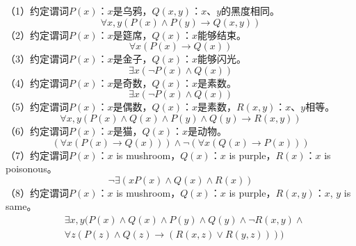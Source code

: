 \begin{solution}
    （1）约定谓词$P(x)$：$x$是乌鸦，$Q(x,y)$：$x$、$y$的黑度相同。
    $$\forall x,y (P(x)\wedge P(y)\rightarrow Q(x,y))$$
    （2）约定谓词$P(x)$：$x$是筵席，$Q(x)$：$x$能够结束。
    $$\forall x (P(x)\rightarrow Q(x))$$
    （3）约定谓词$P(x)$：$x$是金子，$Q(x)$：$x$能够闪光。
    $$\exists x (\neg P(x) \wedge Q(x))$$
    （4）约定谓词$P(x)$：$x$是奇数，$Q(x)$：$x$是素数。
    $$\exists x (\neg P(x) \wedge Q(x))$$
    （5）约定谓词$P(x)$：$x$是偶数，$Q(x)$：$x$是素数，$R(x,y)$：$x$、$y$相等。
    $$\forall x,y (P(x)\wedge Q(x)\wedge P(y)\wedge Q(y)\rightarrow R(x,y))$$
    （6）约定谓词$P(x)$：$x$是猫，$Q(x)$：$x$是动物。
    $$(\forall x (P(x)\rightarrow Q(x)))\wedge \neg(\forall x (Q(x)\rightarrow P(x)))$$
    （7）约定谓词$P(x)$：$x$ is mushroom，$Q(x)$：$x$ is purple，$R(x)$：$x$ is poisonous。
    $$\neg \exists (x P(x)\wedge Q(x)\wedge R(x))$$
    （8）约定谓词$P(x)$：$x$ is mushroom，$Q(x)$：$x$ is purple，$R(x,y)$：$x$, $y$ is same。
    \begin{align*}
        &\exists x,y(P(x)\wedge Q(x)\wedge P(y)\wedge Q(y)\wedge \neg R(x,y) \wedge \\
        &\forall z(P(z)\wedge Q(z)\rightarrow (R(x,z)\vee R(y,z))))
    \end{align*}
\end{solution}